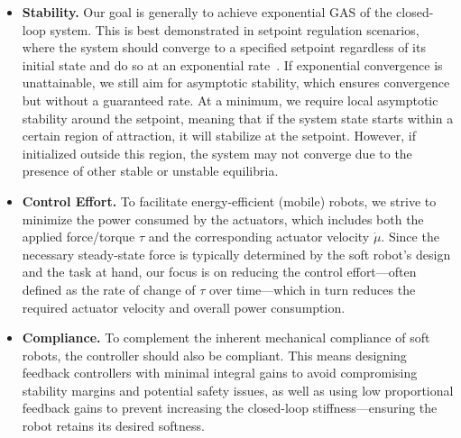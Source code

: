 \begin{itemize}
    \item \textbf{Stability.}  Our goal is generally to achieve exponential \gls{GAS} of the closed-loop system. This is best demonstrated in setpoint regulation scenarios, where the system should converge to a specified setpoint regardless of its initial state and do so at an exponential rate~\citep{khalil2002nonlinear}. If exponential convergence is unattainable, we still aim for asymptotic stability, which ensures convergence but without a guaranteed rate. At a minimum, we require local asymptotic stability around the setpoint, meaning that if the system state starts within a certain region of attraction, it will stabilize at the setpoint. However, if initialized outside this region, the system may not converge due to the presence of other stable or unstable equilibria.
    \item \textbf{Control Effort.} 
    To facilitate energy-efficient (mobile) robots, we strive to minimize the power consumed by the actuators, which includes both the applied force/torque $\tau$ and the corresponding actuator velocity $\dot{\mu}$. Since the necessary steady-state force is typically determined by the soft robot’s design and the task at hand, our focus is on reducing the control effort—often defined as the rate of change of $\tau$ over time—which in turn reduces the required actuator velocity and overall power consumption.
    \item \textbf{Compliance.} 
    To complement the inherent mechanical compliance of soft robots, the controller should also be compliant. This means designing feedback controllers with minimal integral gains to avoid compromising stability margins and potential safety issues, as well as using low proportional feedback gains to prevent increasing the closed-loop stiffness—ensuring the robot retains its desired softness.

\end{itemize}
